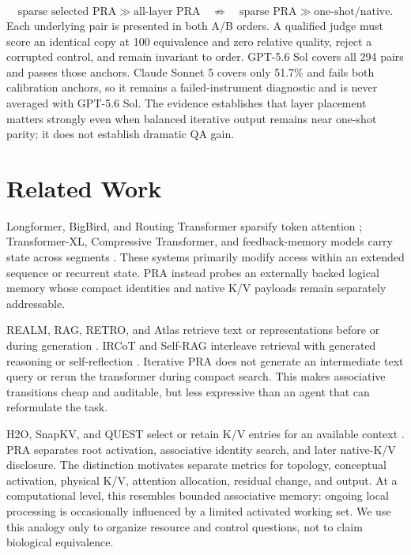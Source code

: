 \[
\text{sparse selected PRA} \gg \text{all-layer PRA}
\quad\not\Rightarrow\quad
\text{sparse PRA} \gg \text{one-shot/native}.
\]
Each underlying pair is presented in both A/B orders.  A qualified judge must score an identical
copy at 100 equivalence and zero relative quality, reject a corrupted control, and remain invariant
to order.  GPT-5.6 Sol covers all 294 pairs and passes those anchors.  Claude Sonnet 5 covers only
51.7\% and fails both calibration anchors, so it remains a failed-instrument diagnostic and is never
averaged with GPT-5.6 Sol.  The evidence establishes that layer placement matters strongly even
when balanced iterative output remains near one-shot parity; it does not establish dramatic QA gain.

\section{Related Work}

Longformer, BigBird, and Routing Transformer sparsify token attention
\cite{beltagy2020longformer,zaheer2020bigbird,roy2021routing}; Transformer-XL, Compressive
Transformer, and feedback-memory models carry state across segments
\cite{dai2019transformerxl,rae2020compressive,hwang2024fam}.  These systems primarily modify access
within an extended sequence or recurrent state.  PRA instead probes an externally backed logical
memory whose compact identities and native K/V payloads remain separately addressable.

REALM, RAG, RETRO, and Atlas retrieve text or representations before or during generation
\cite{guu2020realm,lewis2020rag,borgeaud2022retro,izacard2023atlas}.  IRCoT and Self-RAG interleave
retrieval with generated reasoning or self-reflection \cite{trivedi2023ircot,asai2024selfrag}.
Iterative PRA does not generate an intermediate text query or rerun the transformer during compact
search.  This makes associative transitions cheap and auditable, but less expressive than an agent
that can reformulate the task.

H2O, SnapKV, and QUEST select or retain K/V entries for an available context
\cite{zhang2023h2o,li2024snapkv,tang2024quest}.  PRA separates root activation, associative identity
search, and later native-K/V disclosure.  The distinction motivates separate metrics for topology,
conceptual activation, physical K/V, attention allocation, residual change, and output.  At a
computational level, this resembles bounded associative memory: ongoing local processing is
occasionally influenced by a limited activated working set.  We use this analogy only to organize
resource and control questions, not to claim biological equivalence.

